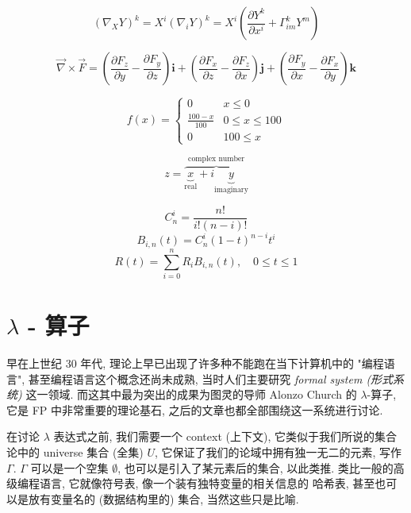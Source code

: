 \documentclass[11pt]{article}
\begin{document}
\begin{equation}
(\nabla_X Y)^k = X^i (\nabla_i Y)^k = X^i \left( \frac{\partial Y^k}{\partial x^i} + \Gamma_{im}^k Y^m \right)
\end{equation}

\begin{equation}
\vec{\nabla} \times \vec{F} = \left( \frac{\partial F_z}{\partial y} - \frac{\partial F_y}{\partial z} \right) \mathbf{i}
        + \left( \frac{\partial F_x}{\partial z} - \frac{\partial F_z}{\partial x} \right) \mathbf{j} + \left( \frac{\partial
        F_y}{\partial x} - \frac{\partial F_x}{\partial y} \right) \mathbf{k}
\end{equation}

\begin{equation}
f(x) = \begin{cases} 
	0 & x\leq 0 \\
	\frac{100-x}{100} & 0\leq x\leq 100 \\
	0 & 100\leq x 
\end{cases}
\end{equation}

\begin{equation}
z = \overbrace{
	\underbrace{x}_\text{real} + i
	\underbrace{y}_\text{imaginary}
}^\text{complex number}
\end{equation}

\begin{equation}
C_n^i=\frac{n!}{i!(n-i)!}
\end{equation}
\begin{equation}
B_{i,n}(t)=C_n^i(1-t)^{n-i}t^i
\end{equation}
\begin{equation}
R(t)=\sum_{i=0}^n R_iB_{i,n}(t),\quad 0\leq t\leq 1
\end{equation}

\setmainfont{WenQuanYi Zen Hei}

\section{$\lambda$ - 算子}

早在上世纪 30 年代, 理论上早已出现了许多种不能跑在当下计算机中的 "编程语言", 甚至编程语言这个概念还尚未成熟, 当时人们主要研究 \textit{formal system (形式系统)} 这一领域. 而这其中最为突出的成果为图灵的导师 Alonzo Church 的 $\lambda$-算子, 它是 FP 中非常重要的理论基石, 之后的文章也都全部围绕这一系统进行讨论.

在讨论 $\lambda$ 表达式之前, 我们需要一个 context (上下文), 它类似于我们所说的集合论中的 universe 集合 (全集) $U$, 它保证了我们的论域中拥有独一无二的元素, 写作 $\Gamma$. $\Gamma$ 可以是一个空集 $\emptyset$, 也可以是引入了某元素后的集合, 以此类推. 类比一般的高级编程语言, 它就像符号表, 像一个装有独特变量的相关信息的 哈希表, 甚至也可以是放有变量名的 (数据结构里的) 集合, 当然这些只是比喻.
\end{document}
